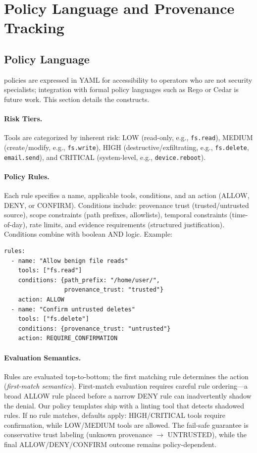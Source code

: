 \section{Policy Language and Provenance Tracking}
\label{sec:policies}

\subsection{Policy Language}

\sys{} policies are expressed in YAML for accessibility to operators who are not security specialists; integration with formal policy languages such as Rego or Cedar is future work. This section details the constructs.

\paragraph{Risk Tiers.}
Tools are categorized by inherent risk: LOW (read-only, e.g., \texttt{fs.read}), MEDIUM (create/modify, e.g., \texttt{fs.write}), HIGH (destructive/exfiltrating, e.g., \texttt{fs.delete}, \texttt{email.send}), and CRITICAL (system-level, e.g., \texttt{device.reboot}).

\paragraph{Policy Rules.}
Each rule specifies a name, applicable tools, conditions, and an action (ALLOW, DENY, or CONFIRM). Conditions include: provenance trust (trusted/untrusted source), scope constraints (path prefixes, allowlists), temporal constraints (time-of-day), rate limits, and evidence requirements (structured justification). Conditions combine with boolean AND logic. Example:

\begin{verbatim}
rules:
  - name: "Allow benign file reads"
    tools: ["fs.read"]
    conditions: {path_prefix: "/home/user/",
                 provenance_trust: "trusted"}
    action: ALLOW
  - name: "Confirm untrusted deletes"
    tools: ["fs.delete"]
    conditions: {provenance_trust: "untrusted"}
    action: REQUIRE_CONFIRMATION
\end{verbatim}

\paragraph{Evaluation Semantics.}
Rules are evaluated top-to-bottom; the first matching rule determines the action (\emph{first-match semantics}). First-match evaluation requires careful rule ordering---a broad ALLOW rule placed before a narrow DENY rule can inadvertently shadow the denial. Our policy templates ship with a linting tool that detects shadowed rules. If no rule matches, defaults apply: HIGH/CRITICAL tools require confirmation, while LOW/MEDIUM tools are allowed. The fail-safe guarantee is conservative trust labeling (unknown provenance $\to$ UNTRUSTED), while the final ALLOW/DENY/CONFIRM outcome remains policy-dependent.

